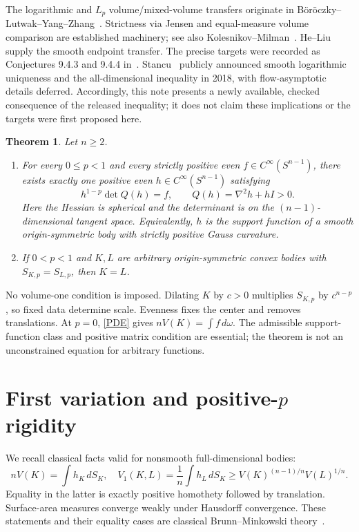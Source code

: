 \documentclass[11pt]{article}
\newtheorem{theorem}{Theorem}
\newcommand{\Sph}{S^{n-1}}
\newcommand{\Q}{Q}
\begin{document}
The logarithmic and $L_p$ volume/mixed-volume transfers originate in B\"or\"oczky--Lutwak--Yang--Zhang~\cite{BLYZ}. Strictness via Jensen and equal-measure volume comparison are established machinery; see also Kolesnikov--Milman~\cite[Proposition 11.1]{KM}. He--Liu~\cite[Theorem 4 and Section 3]{HL} supply the smooth endpoint transfer. The precise targets were recorded as Conjectures 9.4.3 and 9.4.4 in~\cite{BFR}. Stancu~\cite[Corollary 1 and Theorem 2]{Stancu} publicly announced smooth logarithmic uniqueness and the all-dimensional inequality in 2018, with flow-asymptotic details deferred. Accordingly, this note presents a newly available, checked consequence of the released inequality; it does not claim these implications or the targets were first proposed here.

\begin{theorem}\label{main}
Let $n\ge2$.
\begin{enumerate}
\item For every $0\le p<1$ and every strictly positive even $f\in C^\infty(\Sph)$, there exists exactly one positive even $h\in C^\infty(\Sph)$ satisfying
\begin{equation}\label{PDE}
 h^{1-p}\det\Q(h)=f,\qquad \Q(h)=\nabla^2h+hI>0.
\end{equation}
Here the Hessian is spherical and the determinant is on the $(n-1)$-dimensional tangent space. Equivalently, $h$ is the support function of a smooth origin-symmetric body with strictly positive Gauss curvature.
\item If $0<p<1$ and $K,L$ are arbitrary origin-symmetric convex bodies with $S_{K,p}=S_{L,p}$, then $K=L$.
\end{enumerate}
\end{theorem}

No volume-one condition is imposed. Dilating $K$ by $c>0$ multiplies $S_{K,p}$ by $c^{n-p}$, so fixed data determine scale. Evenness fixes the center and removes translations. At $p=0$, \eqref{PDE} gives $nV(K)=\int f\,d\omega$. The admissible support-function class and positive matrix condition are essential; the theorem is not an unconstrained equation for arbitrary functions.

\section{First variation and positive-\texorpdfstring{$p$}{p} rigidity}

We recall classical facts valid for nonsmooth full-dimensional bodies:
\[
 nV(K)=\int h_K\,dS_K,\quad
 V_1(K,L)=\frac1n\int h_L\,dS_K
 \ge V(K)^{(n-1)/n}V(L)^{1/n}.
\]
Equality in the latter is exactly positive homothety followed by translation. Surface-area measures converge weakly under Hausdorff convergence. These statements and their equality cases are classical Brunn--Minkowski theory~\cite{BFR}.
\end{document}
